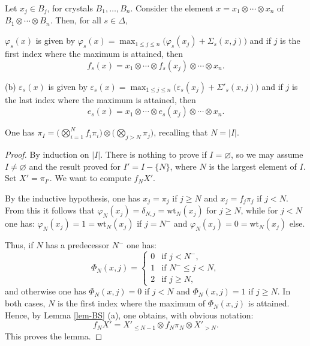 \documentclass[10pt,a4paper]{amsart}
\def\wt{\mathrm{wt}}  %
\let\vep\varepsilon
\begin{document}
\begin{lem}\label{lem-BS} 
Let $x_j \in B_j$, for crystals $B_1, \dots, B_n$. Consider the element $x = x_1 \otimes \cdots \otimes x_n$ of 
$B_1 \otimes \cdots \otimes B_n$. Then, for all $s\in \Delta$, 

 $\varphi_s(x)$ is given by 
$\varphi_s(x) = \max_{1\leq j\leq n} \Big( \varphi_s(x_j) + \Sigma_s(x,j) \Big)$ 
and if  $j$ is the first index where the maximum is attained, then
$$
f_s(x)
=
x_1 \otimes \cdots \otimes f_s(x_j)\otimes \cdots \otimes x_n.
$$

{\rm (b)} $\vep_s(x)$ is given by 
$\vep_s(x) = \max_{1\leq j\leq n} \Big( \vep_s(x_j) + \Sigma'_s(x,j) \Big)$
and if  $j$  is the last index where the maximum is attained, then
$$
e_s(x)
=
x_1 \otimes \cdots \otimes e_s(x_j)\otimes \cdots \otimes x_n.
$$
\end{lem} 

\begin{lem}\label{lem-pi-I} 
One has $\pi_I = \Big( \bigotimes_{i=1}^N f_i \pi_i \Big) \otimes \Big( \bigotimes_{j > N} \pi_j \Big)$, recalling that 
$N = \vert I \vert$. 
\end{lem}

\begin{proof} By induction on $\vert I\vert$. There is nothing to prove if $I = \varnothing$, so we may assume 
$I \not= \varnothing$
and the result proved for $I' = I - \{N\}$, where $N$ is the largest element of $I$. 
Set $X' = \pi_{I'}$. We want to compute $f_N X'$. 

\smallskip 
By the inductive hypothesis, one has $x_j = \pi_j$ if $j\geq N$ and $x_j = f_j \pi_j$ if $j < N$. 
From this it follows that $\varphi_N(x_j) = \delta_{N,j} = \wt_N(x_j) $ for $j\geq N$, while for $j < N$ one has: 
$\varphi_N(x_j) = 1 = \wt_N(x_j)$ if $j = N^-$ and $\varphi_N(x_j) = 0 = \wt_N(x_j)$ else. 

Thus, if $N$ has a predecessor $N^-$ one has: 
$$
\Phi_N(x,j) = 
\begin{cases} 
0 & \text{if } j < N^-, 
\\
1 & \text{if } N^- \leq j < N, 
\\
2 & \text{if } j \geq  N,
\end{cases}
$$
and otherwise one has $\Phi_N(x,j) = 0$ if $j < N$ and $\Phi_N(x,j) = 1$ if $j\geq N$. 
In both cases, $N$ is the first index where the maximum of $\Phi_N(x,j)$ is attained. Hence, by Lemma \ref{lem-BS} (a), 
one obtains, with obvious notation: 
$$
f_N X' = X'_{\leq N-1} \otimes f_N \pi_N \otimes X'_{> N}.
$$
This proves the lemma.
\end{proof} 
\end{document}
